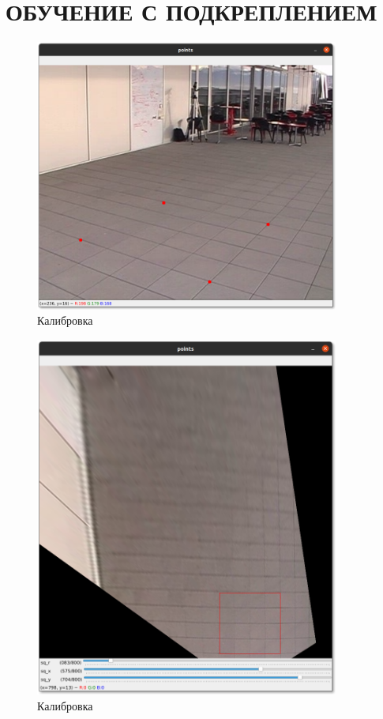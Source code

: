\chapter{ОБУЧЕНИЕ С ПОДКРЕПЛЕНИЕМ}


\begin{figure}[H]
    \centering
    \includegraphics[width=10cm]{images/calibration1.png}
    \caption{Калибровка}
    \label{<label>}
\end{figure}

\begin{figure}[H]
    \centering
    \includegraphics[width=10cm]{images/calibration2.png}
    \caption{Калибровка}
    \label{<label>}
\end{figure}


